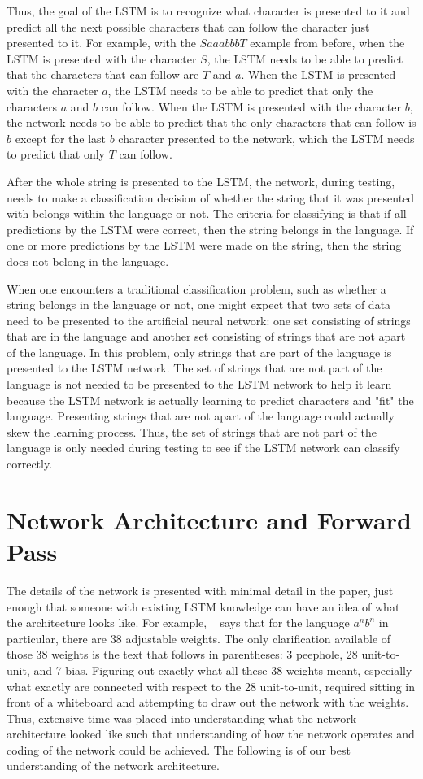\documentclass[11pt,letterpaper]{article}
\begin{document}
	Thus, the goal of the LSTM is to recognize what character is presented to it and predict all the next possible characters that can follow the character just presented to it. For example, with the $SaaabbbT$ example from before, when the LSTM is presented with the character $S$, the LSTM needs to be able to predict that the characters that can follow are $T$ and $a$. When the LSTM is presented with the character $a$, the LSTM needs to be able to predict that only the characters $a$ and $b$ can follow. When the LSTM is presented with the character $b$, the network needs to be able to predict that the only characters that can follow is $b$ except for the last $b$ character presented to the network, which the LSTM needs to predict that only $T$ can follow.

	After the whole string is presented to the LSTM, the network, during testing, needs to make a classification decision of whether the string that it was presented with belongs within the language or not. The criteria for classifying is that if all predictions by the LSTM were correct, then the string belongs in the language. If one or more predictions by the LSTM were made on the string, then the string does not belong in the language.

	When one encounters a traditional classification problem, such as whether a string belongs in the language or not, one might expect that two sets of data need to be presented to the artificial neural network: one set consisting of strings that are in the language and another set consisting of strings that are not apart of the language. In this problem, only strings that are part of the language is presented to the LSTM network. The set of strings that are not part of the language is not needed to be presented to the LSTM network to help it learn because the LSTM network is actually learning to predict characters and "fit" the language. Presenting strings that are not apart of the language could actually skew the learning process. Thus, the set of strings that are not part of the language is only needed during testing to see if the LSTM network can classify correctly.

	\section{Network Architecture and Forward Pass}
	The details of the network is presented with minimal detail in the paper, just enough that someone with existing LSTM knowledge can have an idea of what the architecture looks like. For example, ~\cite{Gers:01} says that for the language $a^nb^n$ in particular, there are 38 adjustable weights. The only clarification available of those 38 weights is the text that follows in parentheses: 3 peephole, 28 unit-to-unit, and 7 bias. Figuring out exactly what all these 38 weights meant, especially what exactly are connected with respect to the 28 unit-to-unit, required sitting in front of a whiteboard and attempting to draw out the network with the weights.  Thus, extensive time was placed into understanding what the network architecture looked like such that understanding of how the network operates and coding of the network could be achieved. The following is of our best understanding of the network architecture.
\end{document}
